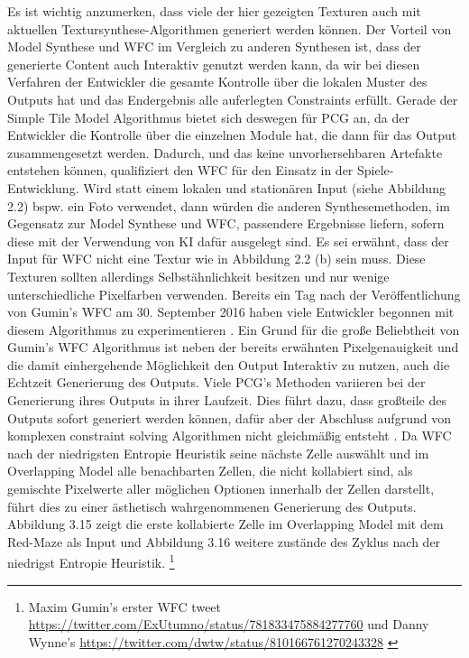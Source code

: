 \documentclass[12pt, a4paper,twoside,openany]{report} %
\begin{document}
Es ist wichtig anzumerken, dass viele der hier gezeigten Texturen auch mit aktuellen Textursynthese-Algorithmen generiert werden können.
Der Vorteil von Model Synthese und WFC im Vergleich zu anderen Synthesen ist, dass der generierte Content auch Interaktiv genutzt werden kann,
da wir bei diesen Verfahren der Entwickler die gesamte Kontrolle über die lokalen Muster des Outputs hat und das Endergebnis alle auferlegten Constraints erfüllt.
Gerade der Simple Tile Model Algorithmus bietet sich deswegen für PCG an, da der Entwickler die Kontrolle über die einzelnen Module hat,
die dann für das Output zusammengesetzt werden.
Dadurch, und das keine unvorhersehbaren Artefakte entstehen können, qualifiziert den WFC für den Einsatz in der Spiele-Entwicklung.
Wird statt einem lokalen und stationären Input {(siehe Abbildung 2.2)} bspw. ein Foto verwendet,
dann würden die anderen Synthesemethoden, im Gegensatz zur Model Synthese und WFC, passendere Ergebnisse liefern, sofern diese mit der Verwendung von KI dafür ausgelegt sind.
Es sei erwähnt, dass der Input für WFC nicht  eine Textur wie in Abbildung 2.2 {(b)} sein muss.
Diese Texturen sollten allerdings Selbstähnlichkeit besitzen und nur wenige unterschiedliche Pixelfarben verwenden.
Bereits ein Tag nach der Veröffentlichung von Gumin's WFC am 30. September 2016 haben viele Entwickler begonnen mit diesem Algorithmus zu experimentieren \cite{Karth2017WaveFunctionCollapseIC}.
Ein Grund für die große Beliebtheit von Gumin's WFC Algorithmus ist neben der bereits erwähnten Pixelgenauigkeit und die damit einhergehende Möglichkeit den Output Interaktiv zu nutzen,
auch die Echtzeit Generierung des Outputs.
Viele PCG's Methoden variieren bei der Generierung ihres Outputs in ihrer Laufzeit.
Dies führt dazu, dass großteile des Outputs sofort generiert werden können,
dafür aber der Abschluss aufgrund von komplexen constraint solving Algorithmen nicht gleichmäßig entsteht \cite{Karth2017WaveFunctionCollapseIC}.
Da WFC nach der niedrigsten Entropie Heuristik seine nächste Zelle auswählt und im Overlapping Model alle benachbarten Zellen, die nicht kollabiert sind,
als gemischte Pixelwerte aller möglichen Optionen innerhalb der Zellen darstellt, führt dies zu einer ästhetisch wahrgenommenen Generierung des Outputs.
Abbildung 3.15 zeigt die erste kollabierte Zelle im Overlapping Model mit dem Red-Maze als Input und Abbildung 3.16 weitere zustände des Zyklus nach der niedrigst Entropie Heuristik.
\footnote[4]{Maxim Gumin’s erster WFC tweet 
\newline
\url{https://twitter.com/ExUtumno/status/781833475884277760}
\newline
und Danny Wynne’s 
\newline
\url{https://twitter.com/dwtw/status/810166761270243328} \cite{Karth2017WaveFunctionCollapseIC}}
\end{document}
